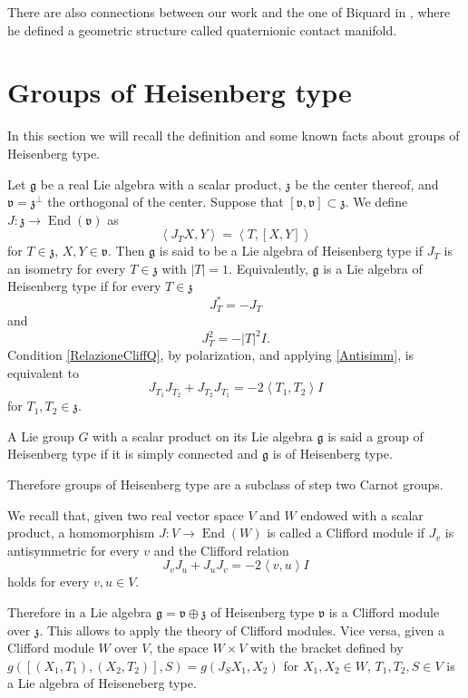 \documentclass{article}
\newcommand{\g}[1]{\mathfrak{#1}}
\newcommand{\bra}{\left\langle}
\newcommand{\ket}{\right\rangle}
\DeclareMathOperator{\End}{End}
\theoremstyle{definition}
\theoremstyle{remark}
\begin{document}
There are also connections between our work and the one of Biquard in \cite{B}, where he defined a geometric structure called quaternionic contact manifold.

\section{Groups of Heisenberg type}\label{SezionePreliminare}
In this section we will recall the definition and some known facts about groups of Heisenberg type.

Let $\g{g}$ be a real Lie algebra with a scalar product, $\g{z}$ be the center thereof, and $\g{v}=\g{z}^{\perp}$ the orthogonal of the center. Suppose that $[\g{v},\g{v}]\subset\g{z}$.
We define $J:\g{z}\to\End(\g{v})$ as
$$\bra J_TX,Y\ket = \bra T, [X,Y]\ket$$
for $T\in\g{z}$, $X,Y\in\g{v}$.
Then $\g{g}$ is said to be a Lie algebra of Heisenberg type if $J_T$ is an isometry for every $T\in\g{z}$ with $|T|=1$.
Equivalently, $\g{g}$ is a Lie algebra of Heisenberg type if for every $T\in\g{z}$
\begin{equation}\label{Antisimm}
 J_T^* = -J_T
\end{equation}
and
\begin{equation}\label{RelazioneCliffQ}
 J_T^2 = -|T|^2I.
\end{equation}
Condition \eqref{RelazioneCliffQ}, by polarization, and applying \eqref{Antisimm}, is equivalent to
$$ J_{T_1}J_{T_2} + J_{T_2}J_{T_1} = -2\bra T_1,T_2\ket I$$
for $T_1,T_2\in\g{z}$.

A Lie group $G$ with a scalar product on its Lie algebra $\g{g}$ is said a group of Heisenberg type if it is simply connected and $\g{g}$ is of Heisenberg type.

Therefore groups of Heisenberg type are a subclass of step two Carnot groups.

We recall that, given two real vector space $V$ and $W$ endowed with a scalar product, a homomorphism $J:V\to\End(W)$ is called a Clifford module if $J_v$ is antisymmetric for every $v$ and the Clifford relation
$$J_vJ_u+J_uJ_v = -2\bra v,u\ket I$$
holds for every $v,u\in V$.

Therefore in a Lie algebra $\g{g}=\g{v}\oplus\g{z}$ of Heisenberg type $\g{v}$ is a Clifford module over $\g{z}$. This allows to apply the theory of Clifford modules.
Vice versa, given a Clifford module $W$ over $V$, the space $W\times V$ with the bracket defined by $g([(X_1,T_1),(X_2,T_2)],S) = g(J_SX_1,X_2)$ for $X_1,X_2\in W$, $T_1,T_2,S\in V$ is a Lie algebra of Heiseneberg type.
\end{document}
